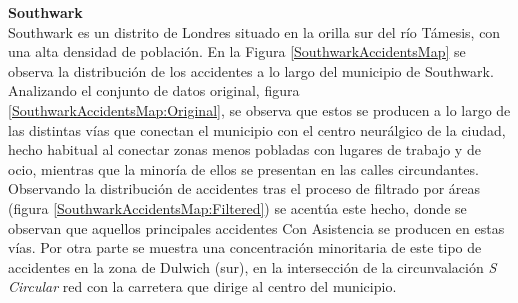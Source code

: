 \textbf{Southwark}\\

Southwark es un distrito de Londres situado en la orilla sur del río Támesis, con una alta densidad de población. En la Figura \ref{SouthwarkAccidentsMap} se observa la distribución de los accidentes a lo largo del municipio de Southwark. Analizando el conjunto de datos original, figura \ref{SouthwarkAccidentsMap:Original}, se observa que estos se producen a lo largo de las distintas vías que conectan el municipio con el centro neurálgico de la ciudad, hecho habitual al conectar zonas menos pobladas con lugares de trabajo y de ocio, mientras que la minoría de ellos se presentan en las calles circundantes. Observando la distribución de accidentes tras el proceso de filtrado por áreas (figura \ref{SouthwarkAccidentsMap:Filtered}) se acentúa este hecho, donde se observan que aquellos principales accidentes Con Asistencia se producen en estas vías. Por otra parte se muestra una concentración minoritaria de este tipo de accidentes en la zona de Dulwich (sur), en la intersección de la circunvalación \textit{S Circular} red con la carretera que dirige al centro del municipio.



